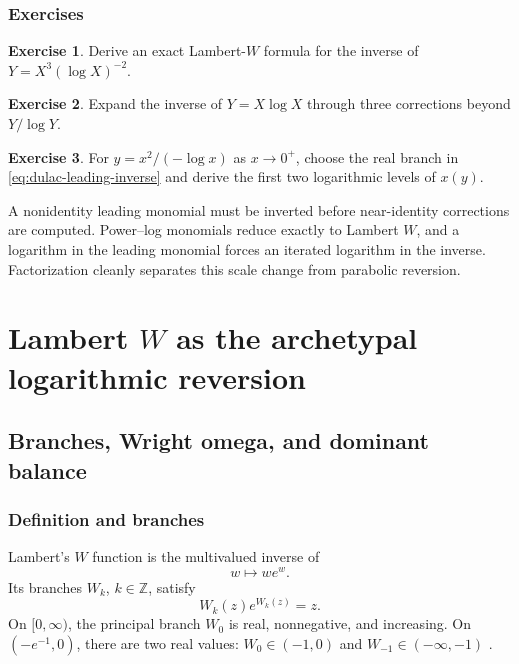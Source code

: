 \documentclass[11pt,openany]{book}
\theoremstyle{definition}
\newtheorem{exercise}{Exercise}[chapter]
\theoremstyle{plain}
\theoremstyle{remark}
\newcommand{\Z}{\mathbb{Z}}
\begin{document}
\section{Exercises}
\begin{exercise}
Derive an exact Lambert-\(W\) formula for the inverse of \(Y=X^3(\log X)^{-2}\).
\end{exercise}
\begin{exercise}
Expand the inverse of \(Y=X\log X\) through three corrections beyond \(Y/\log Y\).
\end{exercise}
\begin{exercise}
For \(y=x^2/(-\log x)\) as \(x\to0^+\), choose the real branch in \cref{eq:dulac-leading-inverse} and derive the first two logarithmic levels of \(x(y)\).
\end{exercise}

\begin{summarybox}
A nonidentity leading monomial must be inverted before near-identity corrections are computed. Power--log monomials reduce exactly to Lambert \(W\), and a logarithm in the leading monomial forces an iterated logarithm in the inverse. Factorization cleanly separates this scale change from parabolic reversion.
\end{summarybox}

\part{Lambert \texorpdfstring{\(W\)}{W} as the archetypal logarithmic reversion}\label{part:lambert}

\chapter{Branches, Wright omega, and dominant balance}\label{ch:W-branches}

\section{Definition and branches}
Lambert's \(W\) function is the multivalued inverse of
\[
 w\longmapsto we^w.
\]
Its branches \(W_k\), \(k\in\Z\), satisfy
\begin{equation}\label{eq:W-definition}
 W_k(z)e^{W_k(z)}=z.
\end{equation}
On \([0,\infty)\), the principal branch \(W_0\) is real, nonnegative, and increasing. On \((-e^{-1},0)\), there are two real values: \(W_0\in(-1,0)\) and \(W_{-1}\in(-\infty,-1)\) \cite{corless-W,dlmf-W}.
\end{document}
